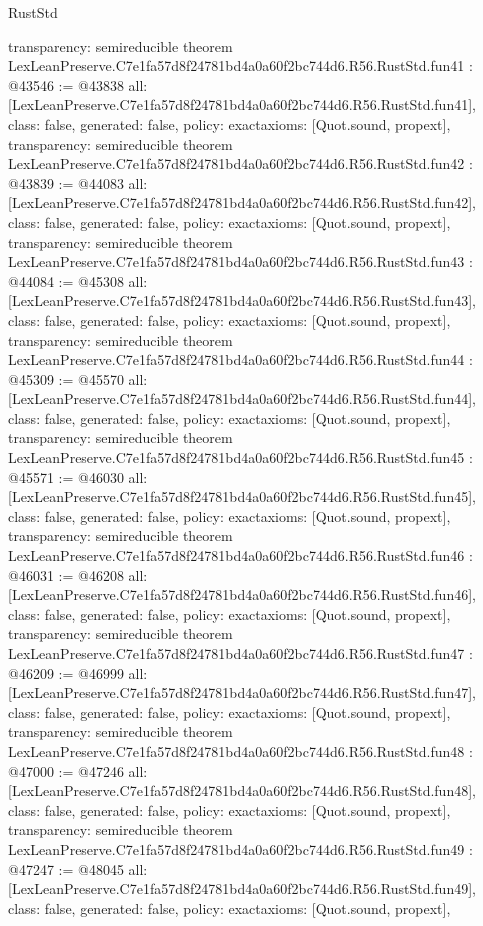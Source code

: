\begin{lexlean}{RustStd}
\begin{coremodule}
{  transparency: semireducible
}
theorem LexLeanPreserve.C7e1fa57d8f24781bd4a0a60f2bc744d6.R56.RustStd.fun41 : @43546 := @43838 {
  all: [LexLeanPreserve.C7e1fa57d8f24781bd4a0a60f2bc744d6.R56.RustStd.fun41],
  class: false,
  generated: false,
  policy: exact{axioms: [Quot.sound, propext]},
  transparency: semireducible
}
theorem LexLeanPreserve.C7e1fa57d8f24781bd4a0a60f2bc744d6.R56.RustStd.fun42 : @43839 := @44083 {
  all: [LexLeanPreserve.C7e1fa57d8f24781bd4a0a60f2bc744d6.R56.RustStd.fun42],
  class: false,
  generated: false,
  policy: exact{axioms: [Quot.sound, propext]},
  transparency: semireducible
}
theorem LexLeanPreserve.C7e1fa57d8f24781bd4a0a60f2bc744d6.R56.RustStd.fun43 : @44084 := @45308 {
  all: [LexLeanPreserve.C7e1fa57d8f24781bd4a0a60f2bc744d6.R56.RustStd.fun43],
  class: false,
  generated: false,
  policy: exact{axioms: [Quot.sound, propext]},
  transparency: semireducible
}
theorem LexLeanPreserve.C7e1fa57d8f24781bd4a0a60f2bc744d6.R56.RustStd.fun44 : @45309 := @45570 {
  all: [LexLeanPreserve.C7e1fa57d8f24781bd4a0a60f2bc744d6.R56.RustStd.fun44],
  class: false,
  generated: false,
  policy: exact{axioms: [Quot.sound, propext]},
  transparency: semireducible
}
theorem LexLeanPreserve.C7e1fa57d8f24781bd4a0a60f2bc744d6.R56.RustStd.fun45 : @45571 := @46030 {
  all: [LexLeanPreserve.C7e1fa57d8f24781bd4a0a60f2bc744d6.R56.RustStd.fun45],
  class: false,
  generated: false,
  policy: exact{axioms: [Quot.sound, propext]},
  transparency: semireducible
}
theorem LexLeanPreserve.C7e1fa57d8f24781bd4a0a60f2bc744d6.R56.RustStd.fun46 : @46031 := @46208 {
  all: [LexLeanPreserve.C7e1fa57d8f24781bd4a0a60f2bc744d6.R56.RustStd.fun46],
  class: false,
  generated: false,
  policy: exact{axioms: [Quot.sound, propext]},
  transparency: semireducible
}
theorem LexLeanPreserve.C7e1fa57d8f24781bd4a0a60f2bc744d6.R56.RustStd.fun47 : @46209 := @46999 {
  all: [LexLeanPreserve.C7e1fa57d8f24781bd4a0a60f2bc744d6.R56.RustStd.fun47],
  class: false,
  generated: false,
  policy: exact{axioms: [Quot.sound, propext]},
  transparency: semireducible
}
theorem LexLeanPreserve.C7e1fa57d8f24781bd4a0a60f2bc744d6.R56.RustStd.fun48 : @47000 := @47246 {
  all: [LexLeanPreserve.C7e1fa57d8f24781bd4a0a60f2bc744d6.R56.RustStd.fun48],
  class: false,
  generated: false,
  policy: exact{axioms: [Quot.sound, propext]},
  transparency: semireducible
}
theorem LexLeanPreserve.C7e1fa57d8f24781bd4a0a60f2bc744d6.R56.RustStd.fun49 : @47247 := @48045 {
  all: [LexLeanPreserve.C7e1fa57d8f24781bd4a0a60f2bc744d6.R56.RustStd.fun49],
  class: false,
  generated: false,
  policy: exact{axioms: [Quot.sound, propext]},
}
\end{coremodule}
\end{lexlean}
